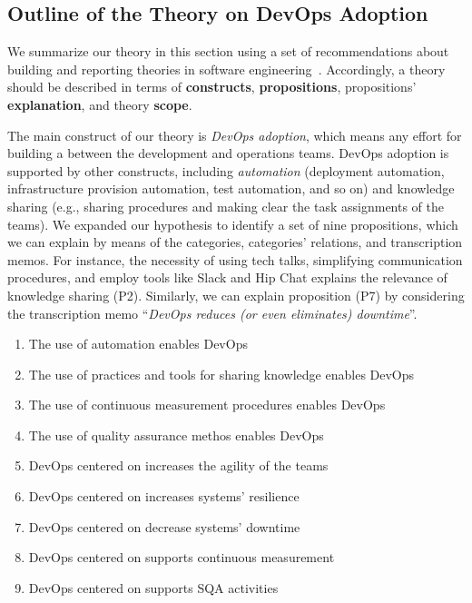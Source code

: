 \subsection{Outline of the Theory on DevOps Adoption}

We summarize our theory in this section using a 
set of recommendations about building and reporting
theories in software engineering~\cite{sjoberg2008}.
Accordingly, a theory should be described in
terms of {\bf constructs},
{\bf propositions}, propositions' {\bf explanation},
and theory {\bf scope}.

The main construct of our theory is \emph{DevOps adoption},
which means any effort for building a \cc between
the development and operations teams. DevOps adoption is
supported by other constructs, including \emph{automation}
(deployment automation, infrastructure provision automation,
test automation, and so on) and knowledge sharing (e.g.,
sharing procedures and making clear the task assignments
of the teams). We expanded our hypothesis to identify
a set of nine propositions, which we can explain
by means of the categories, categories' relations,
and transcription memos. For instance, the necessity of
using tech talks, simplifying communication procedures, and employ
tools like Slack and Hip Chat explains the relevance of knowledge sharing
(P2). Similarly, we can explain proposition (P7) by 
considering the transcription memo ``\emph{DevOps reduces (or even eliminates) downtime}''. 


\begin{enumerate}[(P1)]
 \item The use of automation enables DevOps
 \item The use of practices and tools for sharing knowledge enables DevOps
 \item The use of continuous measurement procedures enables DevOps
 \item The use of quality assurance methos enables DevOps
 \item DevOps centered on \cc increases the agility of the teams
 \item DevOps centered on \cc increases systems' resilience 
 \item DevOps centered on \cc decrease systems'  downtime
 \item DevOps centered on \cc supports continuous measurement 
 \item DevOps centered on \cc supports SQA activities   
\end{enumerate}

